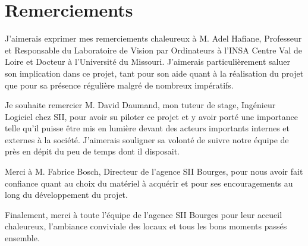 \section*{Remerciements}
{
	J'aimerais exprimer mes remerciements chaleureux à M. Adel Hafiane, Professeur et Responsable du Laboratoire de Vision par Ordinateurs à l'INSA Centre Val de Loire et Docteur à l'Université du Missouri. J'aimerais particulièrement saluer son implication dans ce projet, tant pour son aide quant à la réalisation du projet que pour sa présence régulière malgré de nombreux impératifs.
	\par
	Je souhaite remercier M. David Daumand, mon tuteur de stage, Ingénieur Logiciel chez SII, pour avoir su piloter ce projet et y avoir porté une importance telle qu'il puisse être mis en lumière devant des acteurs importants internes et externes à la société. J'aimerais souligner sa volonté de suivre notre équipe de près en dépit du peu de temps dont il disposait.
	\par
	Merci à M. Fabrice Bosch, Directeur de l'agence SII Bourges, pour nous avoir fait confiance quant au choix du matériel à acquérir et pour ses encouragements au long du développement du projet.
	\par
	Finalement, merci à toute l'équipe de l'agence SII Bourges pour leur accueil chaleureux, l'ambiance conviviale des locaux et tous les bons moments passés ensemble.
}
